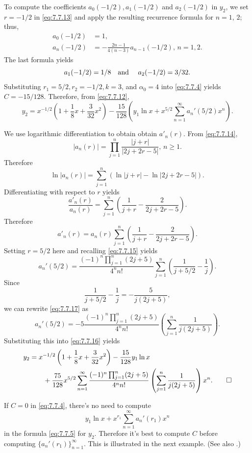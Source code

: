 \begin{solution}
To compute the coefficients $a_0(-1/2),a_1(-1/2)$ and $a_2(-1/2)$ in
$y_2$,
we set $r=-1/2$ in \eqref{eq:7.7.13} and apply the resulting recurrence
formula for $n=1$, $2$;   thus,
\begin{align*}
a_0(-1/2)&=1,\\
a_n(-1/2)&=-\frac{2n-1}{4(n-3)}a_{n-1}(-1/2),\,n=1,2.
\end{align*}
The last formula  yields
\[
a_1(-1/2)=1/8 \text{\quad and \quad} a_2(-1/2)=3/32.
\]
Substituting $r_1=5/2,r_2=-1/2,k=3$, and $\alpha_0=4$ into
 \eqref{eq:7.7.4} yields $C=-15/128$.  Therefore, from
\eqref{eq:7.7.12},
\begin{equation} \label{eq:7.7.16}
y_2=x^{-1/2}\left(1+\frac{1}{8}x+\frac{3}{32}x^2\right)
-\frac{15}{128}
\left(y_1\ln x+x^{5/2}\sum_{n=1}^\infty a_n'(5/2)x^n\right).
\end{equation}

We use logarithmic differentiation to obtain
 obtain $a'_n(r)$. From
\eqref{eq:7.7.14},
\[
|a_n(r)|=\prod_{j=1}^n\frac{|j+r|}{|2j+2r-5|},\,n\ge1.
\]
Therefore
\[
\ln |a_n(r)|=\sum^n_{j=1} \left(\ln |j+r|-\ln|2j+2r-5|\right).
\]
Differentiating  with respect to $r$ yields
\[
\frac{a'_n(r)}{a_n(r)}=\sum^n_{j=1} \left(\frac{1}{j+r}-\frac{2}{2j+2r-5}\right).
\]
Therefore
\[
a'_n(r)=a_n(r) \sum^n_{j=1} \left(\frac{1}{j+r}-\frac{2}{2j+2r-5}\right).
\]
Setting $r=5/2$ here and recalling \eqref{eq:7.7.15} yields
\begin{equation} \label{eq:7.7.17}
a_n'(5/2)=\frac{(-1)^n\prod_{j=1}^n(2j+5)}{4^nn!}\sum_{j=1}^n
\left(\frac{1}{j+5/2}-\frac{1}{j}\right).
\end{equation}
Since
\[
\frac{1}{j+5/2}-\frac{1}{j}=-\frac{5}{j(2j+5)},
\]
we can rewrite \eqref{eq:7.7.17} as
\[
a_n'(5/2)=-5\frac{(-1)^n\prod_{j=1}^n(2j+5)}{4^nn!}
\left(\sum_{j=1}^n\frac{1}{j(2j+5)}\right).
\]
Substituting this into \eqref{eq:7.7.16} yields
\begin{align*}
y_2&=x^{-1/2}\left(1+\frac{1}{8}x+\frac{3}{32}x^2\right)-\frac{15}{128}
y_1\ln x\\
&\qquad{}+\frac{75}{128} x^{5/2}\sum_{n=1}^\infty
\frac{(-1)^n\prod_{j=1}^n(2j+5)}{4^nn!}
\left(\sum_{j=1}^n\frac{1}{j(2j+5)}\right)x^n. \qedhere
\end{align*}
\end{solution}

If $C=0$ in \eqref{eq:7.7.4}, there's no need to compute
\[
y_1\ln x+x^{r_1}\sum_{n=1}^\infty a_n'(r_1)x^n
\]
in the formula \eqref{eq:7.7.5} for $y_2$. Therefore it's best to
compute $C$  before computing $\{a_n'(r_1)\}_{n=1}^\infty$.
This is illustrated  in the next example. (See also
.)




